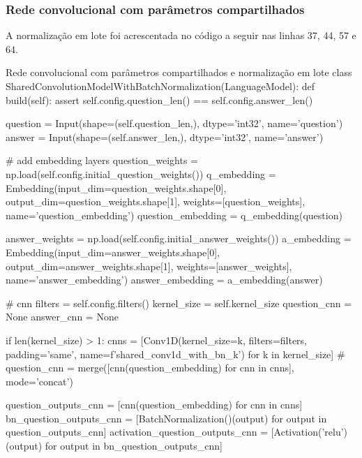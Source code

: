 \subsubsection{Rede convolucional com parâmetros compartilhados}

A normalização em lote foi acrescentada no código a seguir nas linhas 37, 44, 57 e 64.

\begin{mypython-linenumber}{Rede convolucional com parâmetros compartilhados e normalização em lote}
class SharedConvolutionModelWithBatchNormalization(LanguageModel):
    def build(self):
        assert self.config.question_len() == self.config.answer_len()

        question = Input(shape=(self.question_len,), dtype='int32', name='question')
        answer = Input(shape=(self.answer_len,), dtype='int32', name='answer')

        # add embedding layers
        question_weights = np.load(self.config.initial_question_weights())
        q_embedding = Embedding(input_dim=question_weights.shape[0],
                                output_dim=question_weights.shape[1],
                                weights=[question_weights],
                                name='question_embedding')
        question_embedding = q_embedding(question)

        answer_weights = np.load(self.config.initial_answer_weights())
        a_embedding = Embedding(input_dim=answer_weights.shape[0],
                                output_dim=answer_weights.shape[1],
                                weights=[answer_weights],
                                name='answer_embedding')
        answer_embedding = a_embedding(answer)

        # cnn
        filters = self.config.filters()
        kernel_size = self.kernel_size
        question_cnn = None
        answer_cnn = None

        if len(kernel_size) > 1:
            cnns = [Conv1D(kernel_size=k,
                           filters=filters,
                           padding='same',
                           name=f'shared_conv1d_with_bn_{k}') for k in kernel_size]
            # question_cnn = merge([cnn(question_embedding) for cnn in cnns], mode='concat')

            question_outputs_cnn = [cnn(question_embedding) for cnn in cnns]
            bn_question_outputs_cnn = [BatchNormalization()(output) for output in question_outputs_cnn]
            activation_question_outputs_cnn = [Activation('relu')(output) for output in bn_question_outputs_cnn]


\end{mypython-linenumber}
